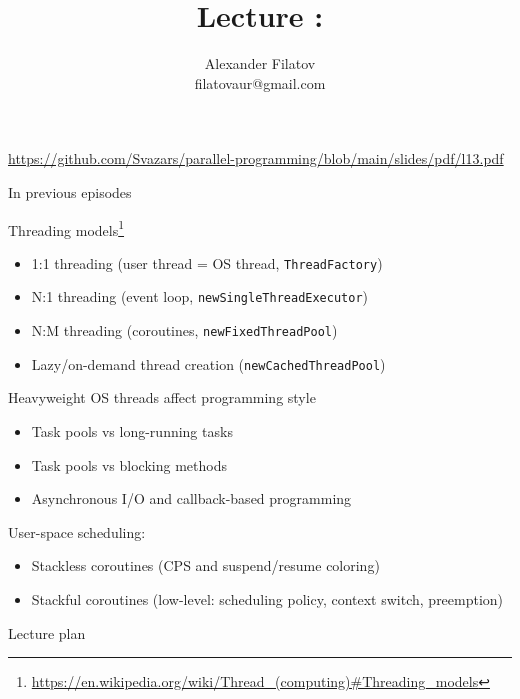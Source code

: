 



\title[]{Lecture \concurrentQueuesNum: \concurrentQueuesNumTopic}
\subtitle[]{\concurrentQueuesNumKey}
\author[]{Alexander Filatov\\ filatovaur@gmail.com}

\date{}



\begin{frame}
  \titlepage
  \url{https://github.com/Svazars/parallel-programming/blob/main/slides/pdf/l13.pdf}
\end{frame}

\begin{frame}{In previous episodes}

Threading models\footnote{\tiny\url{https://en.wikipedia.org/wiki/Thread_(computing)#Threading_models}}
\begin{itemize}
  \item 1:1 threading (user thread = OS thread, \texttt{ThreadFactory})
  \item N:1 threading (event loop, \texttt{newSingleThreadExecutor})
  \item N:M threading (coroutines, \texttt{newFixedThreadPool})
  \item Lazy/on-demand thread creation (\texttt{newCachedThreadPool})
\end{itemize}

Heavyweight OS threads affect programming style 
\begin{itemize}
  \item Task pools vs long-running tasks
  \item Task pools vs blocking methods
  \item Asynchronous I/O and callback-based programming
\end{itemize}

User-space scheduling:
\begin{itemize}
  \item Stackless coroutines (CPS and suspend/resume coloring)
  \item Stackful coroutines (low-level: scheduling policy, context switch, preemption)
\end{itemize}

\end{frame}

\begin{frame}{Lecture plan}
\tableofcontents
\end{frame}

